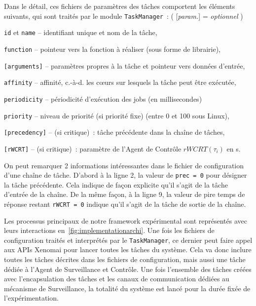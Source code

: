 \documentclass[french, a4paper, 11pt, twoside, pdftex]{StyleThese}
\begin{document}
	Dans le détail, ces fichiers de paramètres des tâches comportent les éléments suivants, qui sont traités par le module \texttt{TaskManager}~: \qquad( [\textit{param.}] = \textit{optionnel} )
	\begin{description}
		\item \texttt{id} et \texttt{name} -- identifiant unique et nom de la tâche,
		\item \texttt{function} -- pointeur vers la fonction à réaliser (sous forme de librairie),
		\item \texttt{[arguments]} -- paramètres propres à la tâche et pointeur vers données d'entrée,
		\item \texttt{affinity} -- affinité, c.-à-d. les cœurs sur lesquels la tâche peut être exécutée,
		\item \texttt{periodicity} -- périodicité d'exécution des jobs (en millisecondes)
		\item \texttt{priority} -- niveau de priorité (si priorité fixe) (entre 0 et 100 sous Linux),
		\item \texttt{[precedency]} -- (si critique)~: tâche précédente dans la chaîne de tâches,
		\item \texttt{[rWCRT]} -- (si critique)~: paramètre de l'Agent de Contrôle $rWCRT(\tau_i)$ en {\textmu}s.
	\end{description}

    On peut remarquer 2 informations intéressantes dans le fichier de configuration d'une chaîne de tâche. D'abord à la ligne 2, la valeur de \texttt{prec = 0} pour désigner la tâche précédente. Cela indique de façon explicite qu'il s'agit de la tâche d'entrée de la chaîne. De la même façon, à la ligne 9, la valeur de pire temps de réponse restant \texttt{rWCRT = 0} indique qu'il s'agit de la tâche de sortie de la chaîne.
    
     Les processus principaux de notre framework expérimental sont représentés avec leurs interactions en~\autoref{fig:implementationarchi}. Une fois les fichiers de configuration traités et interprétés par le \texttt{TaskManager}, ce dernier peut faire appel aux APIs Xenomai pour lancer toutes les tâches du système. Cela va donc inclure toutes les tâches décrites dans les fichiers de configuration, mais aussi une tâche dédiée à l'Agent de Surveillance et Contrôle. Une fois l'ensemble des tâches créées avec l'encapsulation des tâches et les canaux de communication dédiées au mécanisme de Surveillance, la totalité du système est lancé pour la durée fixée de l'expérimentation.
    
\end{document}
